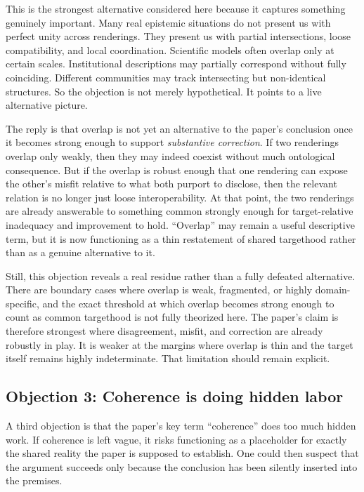 \documentclass[11pt]{article}
\renewcommand{\emph}[1]{\textit{#1}}
\begin{document}
This is the strongest alternative considered here because it captures something genuinely important. Many real epistemic situations do not present us with perfect unity across renderings. They present us with partial intersections, loose compatibility, and local coordination. Scientific models often overlap only at certain scales. Institutional descriptions may partially correspond without fully coinciding. Different communities may track intersecting but non-identical structures. So the objection is not merely hypothetical. It points to a live alternative picture.

The reply is that overlap is not yet an alternative to the paper's conclusion once it becomes strong enough to support \emph{substantive correction}. If two renderings overlap only weakly, then they may indeed coexist without much ontological consequence. But if the overlap is robust enough that one rendering can expose the other's misfit relative to what both purport to disclose, then the relevant relation is no longer just loose interoperability. At that point, the two renderings are already answerable to something common strongly enough for target-relative inadequacy and improvement to hold. ``Overlap'' may remain a useful descriptive term, but it is now functioning as a thin restatement of shared targethood rather than as a genuine alternative to it.

Still, this objection reveals a real residue rather than a fully defeated alternative. There are boundary cases where overlap is weak, fragmented, or highly domain-specific, and the exact threshold at which overlap becomes strong enough to count as common targethood is not fully theorized here. The paper's claim is therefore strongest where disagreement, misfit, and correction are already robustly in play. It is weaker at the margins where overlap is thin and the target itself remains highly indeterminate. That limitation should remain explicit.

\subsection{Objection 3: Coherence is doing hidden labor}

A third objection is that the paper's key term ``coherence'' does too much hidden work. If coherence is left vague, it risks functioning as a placeholder for exactly the shared reality the paper is supposed to establish. One could then suspect that the argument succeeds only because the conclusion has been silently inserted into the premises.
\end{document}
